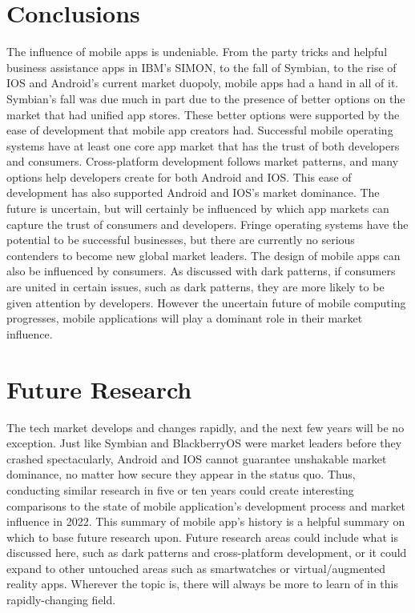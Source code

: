 \documentclass{article}
\begin{document}
\section{Conclusions}
\tab The influence of mobile apps is undeniable. From the party tricks and helpful business assistance apps in IBM's SIMON, to the fall of Symbian, to the rise of IOS and Android's current market duopoly, mobile apps had a hand in all of it. Symbian's fall was due much in part due to the presence of better options on the market that had unified app stores. These better options were supported by the ease of development that mobile app creators had. Successful mobile operating systems have at least one core app market that has the trust of both developers and consumers. Cross-platform development follows market patterns, and many options help developers create for both Android and IOS. This ease of development has also supported Android and IOS's market dominance. The future is uncertain, but will certainly be influenced by which app markets can capture the trust of consumers and developers. Fringe operating systems have the potential to be successful businesses, but there are currently no serious contenders to become new global market leaders. The design of mobile apps can also be influenced by consumers. As discussed with dark patterns, if consumers are united in certain issues, such as dark patterns, they are more likely to be given attention by developers. However the uncertain future of mobile computing progresses, mobile applications will play a dominant role in their market influence.

\section{Future Research}
\tab The tech market develops and changes rapidly, and the next few years will be no exception. Just like Symbian and BlackberryOS were market leaders before they crashed spectacularly, Android and IOS cannot guarantee unshakable market dominance, no matter how secure they appear in the status quo. Thus, conducting similar research in five or ten years could create interesting comparisons to the state of mobile application's development process and market influence in 2022. This summary of mobile app's history is a helpful summary on which to base future research upon. Future research areas could include what is discussed here, such as dark patterns and cross-platform development, or it could expand to other untouched areas such as smartwatches or virtual/augmented reality apps. Wherever the topic is, there will always be more to learn of in this rapidly-changing field.




\end{document}

